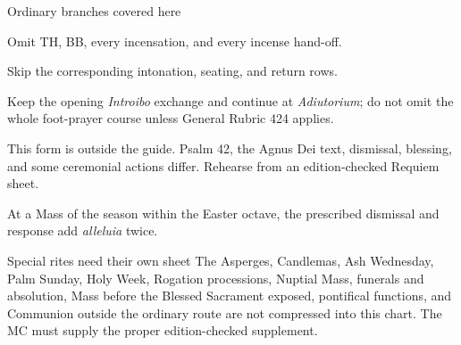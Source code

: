 \begin{coachbox}{Ordinary branches covered here}
\begin{description}[style=multiline,leftmargin=0.27\linewidth,labelwidth=0.24\linewidth]
  \item[No incense.] Omit TH, BB, every incensation, and every incense hand-off.
  \item[No Gloria/Credo.] Skip the corresponding intonation, seating, and
  return rows.
  \item[Psalm 42 omitted.] Keep the opening \textit{Introibo} exchange and
  continue at \textit{Adiutorium}; do not omit the whole foot-prayer course
  unless General Rubric 424 applies.
  \item[Requiem.] This form is outside the guide. Psalm 42, the Agnus Dei text,
  dismissal, blessing, and some ceremonial actions differ. Rehearse from an
  edition-checked Requiem sheet.
  \item[Easter dismissal.] At a Mass of the season within the Easter octave,
  the prescribed dismissal and response add \textit{alleluia} twice.
\end{description}
\end{coachbox}

\begin{watchbox}{Special rites need their own sheet}
The Asperges, Candlemas, Ash Wednesday, Palm Sunday, Holy Week, Rogation
processions, Nuptial Mass, funerals and absolution, Mass before the Blessed
Sacrament exposed, pontifical functions, and Communion outside the ordinary
route are not compressed into this chart. The MC must supply the proper
edition-checked supplement.
\end{watchbox}
